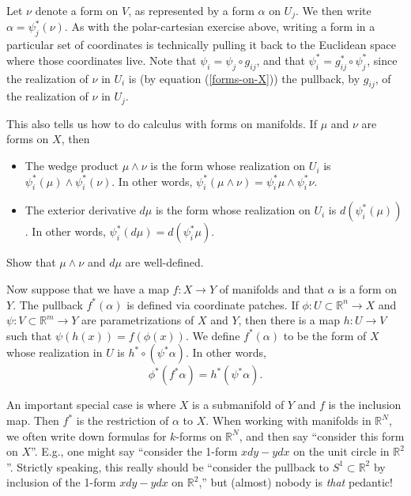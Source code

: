 \documentclass[12pt]{amsbook}
\newcommand{\be}{\begin{equation}}
\newcommand{\ee}{\end{equation}}
\newcommand{\R}{{\mathbb R}}
\theoremstyle{definition}
\begin{document}
Let $\nu$ denote a form on $V$, as represented by a form $\alpha$ on $U_j$.
We then write $\alpha = \psi_j^*(\nu)$. As with the polar-cartesian exercise
above, writing a form in a particular set of coordinates is technically
pulling it back to the Euclidean space where those coordinates live. Note
that $\psi_i = \psi_j \circ g_{ij}$, and 
that $\psi_i^* = g_{ij}^* \circ \psi_j^*$, since the realization of $\nu$ in 
$U_i$ is (by equation (\ref{forms-on-X})) the pullback, by $g_{ij}$, 
of the realization of $\nu$ in $U_j$.

This also tells us how to do calculus with forms on manifolds. If 
$\mu$ and $\nu$ are forms on $X$, then
\begin{itemize}
\item The wedge product $\mu \wedge \nu$ is the form whose realization
on $U_i$ is $\psi_i^*(\mu) \wedge \psi_i^*(\nu)$. In other words,
$\psi_i^*(\mu \wedge \nu) = \psi_i^* \mu \wedge \psi_i^* \nu$. 
\item The exterior derivative $d\mu$ is the form whose realization on
$U_i$ is $d(\psi_i^*(\mu))$. In other words, $\psi_i^*(d\mu) = d(\psi_i^* \mu)$.
\end{itemize}

\smallskip

 Show that $\mu \wedge \nu$ and $d\mu$ are 
well-defined.

\smallskip

Now suppose that we have a map $f: X \to Y$ of manifolds and that $\alpha$
is a form on $Y$. The pullback $f^*(\alpha)$ is defined via coordinate patches.
If $\phi: U\subset \R^n \to X$ and 
$\psi: V \subset \R^m \to Y$ are parametrizations of $X$ and $Y$, then there
is a map $h: U \to V$ such that $\psi(h(x)) = f(\phi(x))$. 
We define $f^*(\alpha)$ to be the form of $X$ whose realization in $U$ is 
$h^* \circ (\psi^* \alpha)$. In other words, 
\be \phi^*(f^* \alpha) = h^*(\psi^* \alpha). \ee

An important special case is where $X$ is a submanifold of $Y$ and $f$ is
the inclusion map.  Then $f^*$ is the restriction of $\alpha$ to $X$. When
working with manifolds in $\R^N$, we often write down formulas for $k$-forms
on $\R^N$, and then say ``consider this form on $X$''. E.g., one might say
``consider the 1-form $x dy - y dx$ on the unit circle in $\R^2$''. Strictly
speaking, this really should be ``consider the pullback to $S^1 \subset \R^2$ 
by inclusion of the 1-form $x dy - y dx$ on $\R^2$,'' but (almost) nobody
is {\em that} pedantic! 
  
\end{document}
